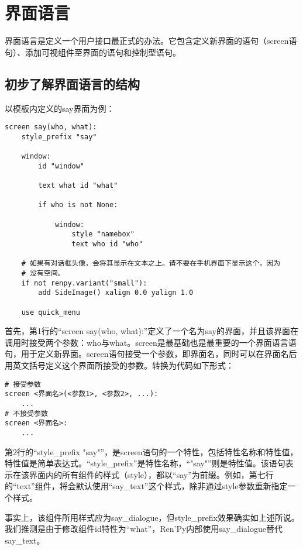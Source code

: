 \section{界面语言}
界面语言是定义一个用户接口最正式的办法。它包含定义新界面的语句（screen语句）、添加可视组件至界面的语句和控制型语句。

\subsection{初步了解界面语言的结构}

以模板内定义的say界面为例：
\begin{lstlisting}
screen say(who, what):
    style_prefix "say"

    window:
        id "window"

        text what id "what"

        if who is not None:

            window:
                style "namebox"
                text who id "who"

    # 如果有对话框头像，会将其显示在文本之上。请不要在手机界面下显示这个，因为
    # 没有空间。
    if not renpy.variant("small"):
        add SideImage() xalign 0.0 yalign 1.0

    use quick_menu
\end{lstlisting}

首先，第1行的“screen say(who, what):”定义了一个名为say的界面，并且该界面在调用时接受两个参数：who与what。screen是最基础也是最重要的一个界面语言语句，用于定义新界面。screen语句接受一个参数，即界面名，同时可以在界面名后用英文括号定义这个界面所接受的参数。转换为代码如下形式：
\begin{lstlisting}
# 接受参数
screen <界面名>(<参数1>, <参数2>, ...):
    ...
# 不接受参数
screen <界面名>:
    ...
\end{lstlisting}

第2行的“style\_prefix "say"”，是screen语句的一个特性，包括特性名称和特性值，特性值是简单表达式。“style\_prefix”是特性名称，“"say"”则是特性值。该语句表示在该界面内的所有组件的样式（style），都以“say”为前缀。例如，第七行的“text”组件，将会默认使用“say\_text”这个样式，除非通过style参数重新指定一个样式。

\begin{ExtraKnowledge}
    事实上，该组件所用样式应为say\_dialogue，但style\_prefix效果确实如上述所说。我们推测是由于修改组件id特性为“what”，Ren'Py内部使用say\_dialogue替代say\_text。
\end{ExtraKnowledge}

